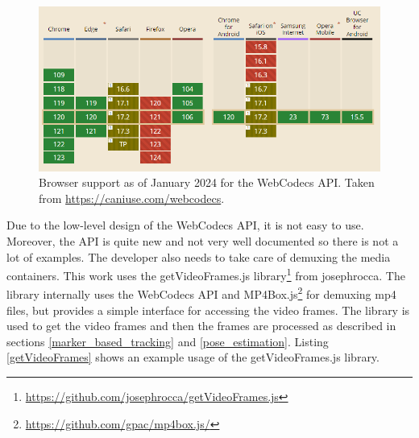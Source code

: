 \begin{figure}[htbp]
    \centering
    \includegraphics[width=\textwidth]{obrazky-figures/caniuseWebcodecs.png}
    \caption{Browser support as of January 2024 for the WebCodecs API. Taken from \url{https://caniuse.com/webcodecs}.}
    \label{fig:caniuseWebcodecs}
\end{figure}
Due to the low-level design of the WebCodecs API, it is not easy to use. Moreover, the API is quite new and not very well documented so there is not a lot of examples. The developer also needs to take care of demuxing the media containers. This work uses the getVideoFrames.js library\footnote{\url{https://github.com/josephrocca/getVideoFrames.js}} from josephrocca. The library internally uses the WebCodecs API and MP4Box.js\footnote{\url{https://github.com/gpac/mp4box.js/}} for demuxing mp4 files, but provides a simple interface for accessing the video frames. The library is used to get the video frames and then the frames are processed as described in sections \ref{marker_based_tracking} and \ref{pose_estimation}. Listing \ref{getVideoFrames} shows an example usage of the getVideoFrames.js library.

